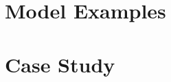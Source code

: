 \documentclass[a4paper]{report}
\def\listofsymbols{ \clearpage}
\theoremstyle{definition}
\begin{document}
	\newpage
	\chapter{Model Examples}\label{chapter:model-examples}
	
	
	
	\newpage
  \chapter{Case Study}\label{chapter:case-study}
  
  
  
\begin{comment}
	\newpage
	\chapter{Conclusion}\label{chapter:conclusion}
	
	
	
	

  \newpage
	{}
	
	\newpage
  \chapter*{List of Symbols\hfill} \addcontentsline{toc}{chapter}{List of Symbols}
\listofsymbols

	\end{comment}
\end{document}
